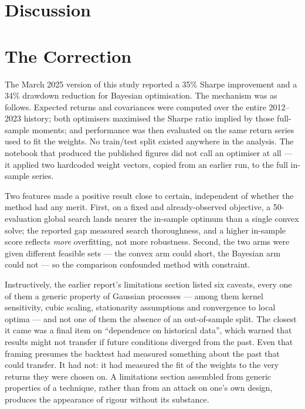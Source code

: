 \documentclass[a4paper,12pt]{article}
\begin{document}


\section{Discussion}


\section{The Correction}
\label{sec:correction}
The March 2025 version of this study reported a 35\% Sharpe improvement and a 34\%
drawdown reduction for Bayesian optimisation. The mechanism was as follows.
Expected returns and covariances were computed over the entire 2012--2023 history;
both optimisers maximised the Sharpe ratio implied by those full-sample moments;
and performance was then evaluated on the same return series used to fit the
weights. No train/test split existed anywhere in the analysis. The notebook that
produced the published figures did not call an optimiser at all --- it applied two
hardcoded weight vectors, copied from an earlier run, to the full in-sample series.

Two features made a positive result close to certain, independent of whether the
method had any merit. First, on a fixed and already-observed objective, a
50-evaluation global search lands nearer the in-sample optimum than a single
convex solve; the reported gap measured search thoroughness, and a higher
in-sample score reflects \emph{more} overfitting, not more robustness. Second, the
two arms were given different feasible sets --- the convex arm could short, the
Bayesian arm could not --- so the comparison confounded method with constraint.

Instructively, the earlier report's limitations section listed six caveats, every
one of them a generic property of Gaussian processes --- among them kernel
sensitivity, cubic scaling, stationarity assumptions and convergence to local
optima --- and not one of them the absence of an out-of-sample split. The closest
it came was a final item on ``dependence on historical data'', which warned that
results might not transfer if future conditions diverged from the past. Even that
framing presumes the backtest had measured something about the past that could
transfer. It had not: it had measured the fit of the weights to the very returns
they were chosen on. A limitations section assembled from generic properties of a
technique, rather than from an attack on one's own design, produces the appearance
of rigour without its substance.
\end{document}
